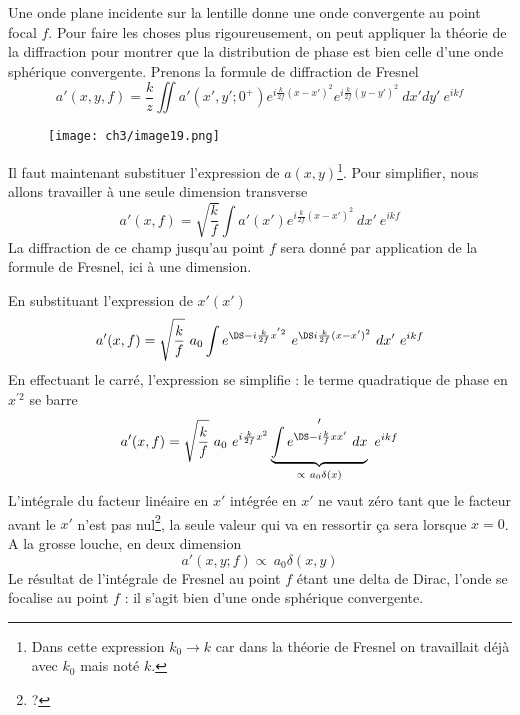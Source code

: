 Une onde plane incidente sur la lentille donne une onde convergente au point focal $f$. Pour faire les 
choses plus rigoureusement, on peut appliquer la théorie de la diffraction pour montrer que la distribution 
de phase est bien celle d'une onde sphérique convergente. Prenons la formule de diffraction de Fresnel
\begin{equation}
a'(x,y,f) = \dfrac{k}{z}\iint a'(x',y';0^+) e^{i\frac{k}{2f}(x-x')^2}e^{i\frac{k}{2f}(y-y')^2}\ dx'dy'\ e^{ikf}
\end{equation}

	\begin{wrapfigure}[8]{l}{5.5cm}
	\vspace{-5mm}
	\texttt{[image: ch3/image19.png]}
	\end{wrapfigure}
Il faut maintenant substituer l'expression de $a(x,y)$\footnote{Dans cette expression $k_0\rightarrow k$ car 
dans la théorie de Fresnel on travaillait déjà avec $k_0$ mais noté $k$.}. Pour simplifier, nous allons 
travailler à une seule dimension transverse
\begin{equation}
a'(x,f) = \sqrt{\dfrac{k}{f}}\int a'(x')e^{i\frac{k}{2f}(x-x')^2}\ dx'\ e^{ikf}
\end{equation}
La diffraction de ce champ jusqu'au point $f$ sera donné par application de la formule de Fresnel, ici à 
une dimension. 


\newpage
En substituant l'expression de $x'(x')$ 
\begin{equation}
a'(x,f) = \sqrt{\dfrac{k}{f}}\ a_0\int e^{\DS-i\frac{k}{2f}x^{'2}}\ e^{\DS i\frac{k}{2f}(x-x')^2}\ dx'\ e^{ikf}
\end{equation}
En effectuant le carré, l'expression se simplifie : le terme quadratique de phase en $x^{'2}$ se barre
\begin{equation}
a'(x,f) = \sqrt{\dfrac{k}{f}}\ a_0\ e^{i\frac{k}{2f}x^2}\underbrace{\int  e^{\DS -i\frac{k}{f}xx'}\ dx}_{
\propto\ a_0\delta(x)}'\ e^{ikf}
\end{equation}
L'intégrale du facteur linéaire en $x'$ intégrée en $x'$ ne vaut zéro tant que le facteur avant le $x'$ 
n'est pas nul\footnote{?}, la seule valeur qui va en ressortir ça sera lorsque $x=0$. A la grosse louche, 
en deux dimension
\begin{equation}
a'(x,y;f) \propto\ a_0\delta(x,y)
\end{equation}
Le résultat de l'intégrale de Fresnel au point $f$ étant une delta de Dirac, l'onde se focalise au point 
$f$ : il s'agit bien d'une onde sphérique convergente.\\

